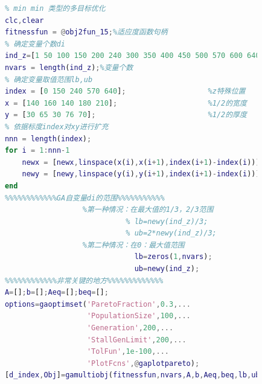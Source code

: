             \begin{lstlisting}[language = Matlab]
            %% 多目标优化IENSGA2的主程序
            % min min 类型的多目标优化
            clc,clear
            fitnessfun = @obj2fun_15;%适应度函数句柄
            % 确定变量个数di
            ind_z=[1 50 100 150 200 240 300 350 400 450 500 570 600 640];
            nvars = length(ind_z);%变量个数
            % 确定变量取值范围lb,ub
            index = [0 150 240 570 640];                   %z特殊位置
            x = [140 160 140 180 210];                     %1/2的宽度
            y = [30 65 30 76 70];                          %1/2的厚度
            % 依据标度index对xy进行扩充
            nnn = length(index);
            for i = 1:nnn-1
                newx = [newx,linspace(x(i),x(i+1),index(i+1)-index(i))];
                newy = [newy,linspace(y(i),y(i+1),index(i+1)-index(i))];
            end
            %%%%%%%%%%%%GA自变量di的范围%%%%%%%%%%%
                              %第一种情况：在最大值的1/3，2/3范围
                                        % lb=newy(ind_z)/3;
                                        % ub=2*newy(ind_z)/3;
                              %第二种情况：在0：最大值范围
                                          lb=zeros(1,nvars);
                                          ub=newy(ind_z);
            %%%%%%%%%%%%非常关键的地方%%%%%%%%%%%%%
            A=[];b=[];Aeq=[];beq=[];
            options=gaoptimset('ParetoFraction',0.3,...
                               'PopulationSize',100,...
                               'Generation',200,...
                               'StallGenLimit',200,...
                               'TolFun',1e-100,...
                               'PlotFcns',@gaplotpareto);
            [d_index,Obj]=gamultiobj(fitnessfun,nvars,A,b,Aeq,beq,lb,ub,options);
            \end{lstlisting}




% 
